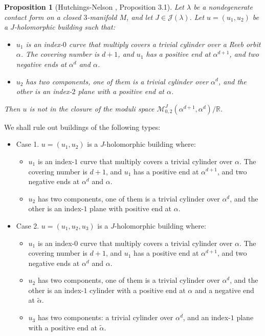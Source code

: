 \documentclass{amsart}
\newcommand{\R}{\mathbb{R}}
\newcommand{\M}{\mathcal{M}}
\newtheorem{prop}[theorem]{Proposition}
\begin{document}
\begin{prop}[Hutchings-Nelson \cite{HN}, Proposition 3.1] \label{3.1} 
Let $\lambda$ be a nondegenerate contact form on a closed $3$-manifold $M$, and let $J \in \mathcal{J}(\lambda)$. Let $u=(u_1,u_2)$ be a $J$-holomorphic building such that:
\begin{itemize}
    \item[(i)] $u_1$ is an index-$0$ curve that multiply covers a trivial cylinder over a Reeb orbit $\alpha$. The covering number is $d+1$, and $u_1$  has a positive end at $\alpha^{d+1}$, and two negative ends at $\alpha^{d}$ and $\alpha$.
    
    \item[(ii)] $u_2$ has two components, one of them is a trivial cylinder over $ \alpha^{d}$, and the other is an index-$2$ plane with a positive end at $\alpha$.
\end{itemize}
Then $u$ is not in the closure of the moduli space $\M_{0,2}^J(\alpha^{d+1},\alpha^d)/\R$.
\end{prop}

We shall rule out buildings of the following types:
\begin{itemize}
 \item Case 1. $u=(u_1,u_2)$ is a $J$-holomorphic building where:
\begin{itemize}
\item $u_1$ is an index-$1$ curve that multiply covers a trivial cylinder over $\alpha$. The covering number is $d+1$, and $u_1$ has  a positive end at $\alpha^{d+1}$, and two negative ends at $\alpha^d$ and $\alpha$.
\item $u_2$ has two components, one of them is a trivial cylinder over $\alpha^d$, and the other is an index-$1$ plane  with positive end at $\alpha$.
\end{itemize}
\item Case 2. $u=(u_1,u_2, u_3)$ is a $J$-holomorphic building where:
 \begin{itemize}
   \item $u_1$ is an index-$0$ curve that multiply covers a trivial cylinder over $\alpha$. The covering number is $d+1$, and $u_1$ has a positive end at $\alpha^{d+1}$, and two negative ends at $\alpha^d$ and $\alpha$. 
   \item $u_2$ has two  components, one of them is a trivial cylinder over $\alpha^{d}$, and the other is an index-$1$ cylinder with a positive end at $\alpha$ and a negative end at $\tilde{\alpha}$.
   \item $u_3$ has two  components: a trivial cylinder over $\alpha^{d}$, and an index-$1$ plane  with a positive end at $\tilde{\alpha}$.
    \end{itemize}
\end{itemize}
\end{document}
